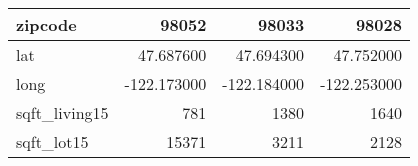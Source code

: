 \begin{table}[H]
\begin{tabular}{|l|r|r|r|}
\hline zipcode & \cellcolor[rgb]{0.9, 0.54, 0.52} 98052 & 98033 & 98028 \\
\hline lat & \cellcolor[rgb]{0.9, 0.54, 0.52} 47.687600 & 47.694300 & 47.752000 \\
\hline long & \cellcolor[rgb]{0.9, 0.54, 0.52} -122.173000 & \cellcolor[rgb]{0.9, 0.54, 0.52} -122.184000 & \cellcolor[rgb]{0.9, 0.54, 0.52} -122.253000 \\
\hline sqft\_living15 & \cellcolor[rgb]{0.9, 0.54, 0.52} 781 & 1380 & 1640 \\
\hline sqft\_lot15 & \cellcolor[rgb]{0.9, 0.54, 0.52} 15371 & 3211 & 2128 \\
\hline
\end{tabular}
\end{table}

